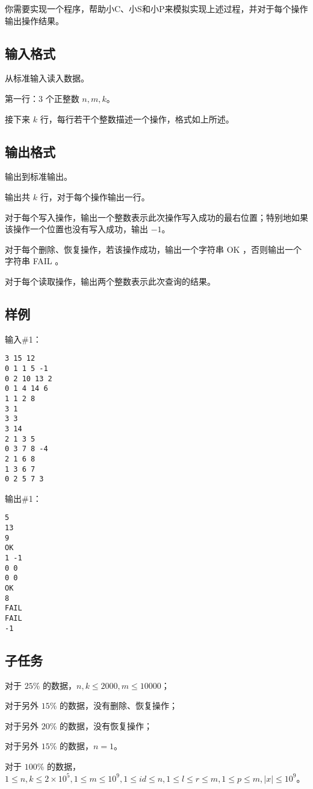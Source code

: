 你需要实现一个程序，帮助小C、小S和小P来模拟实现上述过程，并对于每个操作输出操作结果。

\subsection*{输入格式}

从标准输入读入数据。

第一行：$3$ 个正整数 $n,m,k$。

接下来 $k$ 行，每行若干个整数描述一个操作，格式如上所述。

\subsection*{输出格式}

输出到标准输出。

输出共 $k$ 行，对于每个操作输出一行。

对于每个写入操作，输出一个整数表示此次操作写入成功的最右位置；特别地如果该操作一个位置也没有写入成功，输出 $-1$。

对于每个删除、恢复操作，若该操作成功，输出一个字符串 OK ，否则输出一个字符串 FAIL 。

对于每个读取操作，输出两个整数表示此次查询的结果。

\subsection*{样例}

输入\#1：

\begin{lstlisting}
3 15 12
0 1 1 5 -1
0 2 10 13 2
0 1 4 14 6
1 1 2 8
3 1
3 3
3 14
2 1 3 5
0 3 7 8 -4
2 1 6 8
1 3 6 7
0 2 5 7 3
\end{lstlisting}

输出\#1：

\begin{lstlisting}
5
13
9
OK
1 -1
0 0
0 0
OK
8
FAIL
FAIL
-1
\end{lstlisting}

\subsection*{子任务}

对于 $25$\% 的数据，$n,k\le 2000,m\le 10000$；

对于另外 $15$\% 的数据，没有删除、恢复操作；

对于另外 $20$\% 的数据，没有恢复操作；

对于另外 $15$\% 的数据，$n=1$。

对于 $100$\% 的数据，$1\le n,k\le 2\times 10^5,1\le m\le 10^9,1\le id\le n,1\le l\le r\le m,1\le p\le m,|x|\le 10^9$。